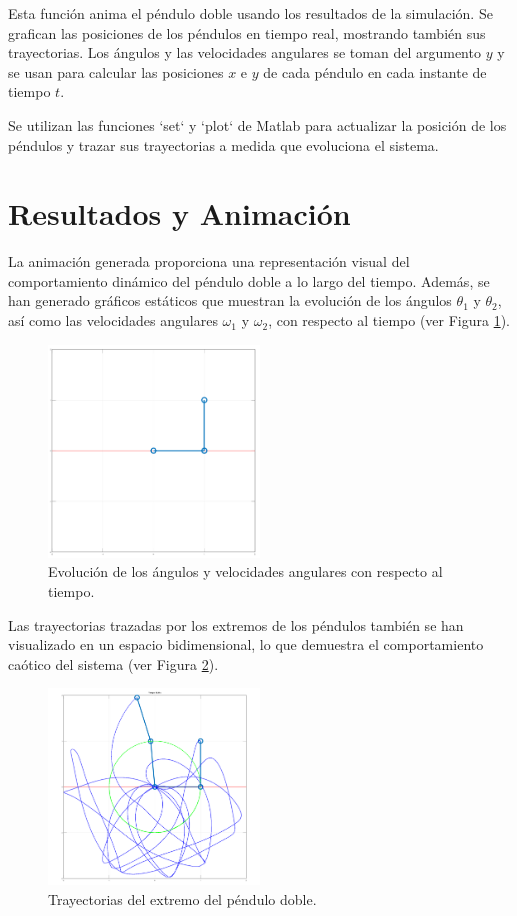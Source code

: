 \documentclass[12pt]{article}
\begin{document}
Esta función anima el péndulo doble usando los resultados de la simulación. Se grafican las posiciones de los péndulos en tiempo real, mostrando también sus trayectorias. Los ángulos y las velocidades angulares se toman del argumento \(y\) y se usan para calcular las posiciones \(x\) e \(y\) de cada péndulo en cada instante de tiempo \(t\).

Se utilizan las funciones `set` y `plot` de Matlab para actualizar la posición de los péndulos y trazar sus trayectorias a medida que evoluciona el sistema.



\section{Resultados y Animación}

La animación generada proporciona una representación visual del comportamiento dinámico del péndulo doble a lo largo del tiempo. Además, se han generado gráficos estáticos que muestran la evolución de los ángulos \(\theta_1\) y \(\theta_2\), así como las velocidades angulares \(\omega_1\) y \(\omega_2\), con respecto al tiempo (ver Figura \ref{fig:evolucion}).

\begin{figure}[H]
\centering
\includegraphics[width=0.5\textwidth]{evolucion.png}
\caption{Evolución de los ángulos y velocidades angulares con respecto al tiempo.}
\label{fig:evolucion}
\end{figure}

Las trayectorias trazadas por los extremos de los péndulos también se han visualizado en un espacio bidimensional, lo que demuestra el comportamiento caótico del sistema (ver Figura \ref{fig:trayectoria}).

\begin{figure}[H]
\centering
\includegraphics[width=0.5\textwidth]{trayectoria.png}
\caption{Trayectorias del extremo del péndulo doble.}
\label{fig:trayectoria}
\end{figure}
\end{document}
